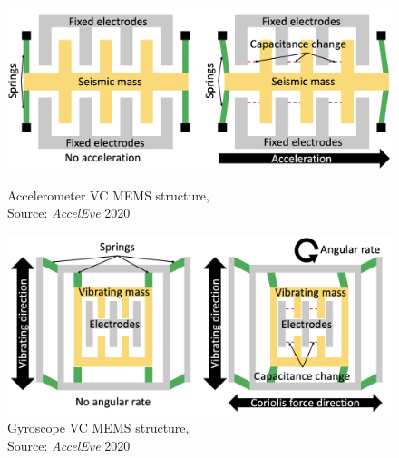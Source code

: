 \documentclass[sigconf, nonacm]{acmart}
\begin{document}
\begin{figure}[H]
  \centering
  \includegraphics[width=\linewidth]{embed/MEMS_accelerometer.png}
  \caption{Accelerometer VC MEMS structure, \\Source: \textit{AccelEve} 2020 \cite{AccelEve2020}}
  \label{fig:MEMS_accelerometer}

  \vspace{0.25cm}

  \includegraphics[width=\linewidth]{embed/MEMS_gyroscope.png}
  \caption{Gyroscope VC MEMS structure, \\Source: \textit{AccelEve} 2020 \cite{AccelEve2020}}
  \label{fig:MEMS_gyroscope}
\end{figure}
\end{document}
